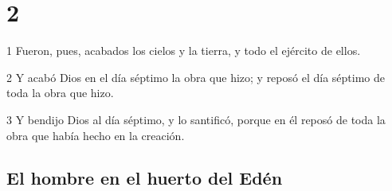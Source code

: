 \chapter{2}

\par 1 Fueron, pues, acabados los cielos y la tierra, y todo el ejército de ellos.
\par 2 Y acabó Dios en el día séptimo la obra que hizo; y reposó el día séptimo de toda la obra que hizo.
\par 3 Y bendijo Dios al día séptimo, y lo santificó, porque en él reposó de toda la obra que había hecho en la creación.

\section*{El hombre en el huerto del Edén}

